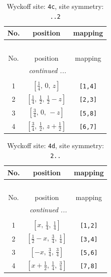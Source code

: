 \documentclass[fleqn,8pt]{jsarticle}
\begin{document}
\renewcommand{\arraystretch}{1.2}
\begin{longtable}{ccc}
\caption{Wyckoff site: {\tt 4c}, site symmetry: {\tt ..2}}
 \\
 \hline \hline
No. & position & mapping \\ \hline \endfirsthead

\multicolumn{2}{l}{\tablename\ \thetable{}} \\
 \hline \hline
No. & position & mapping \\ \hline \endhead

 \hline \hline
\multicolumn{2}{r}{\footnotesize\it continued ...} \\ \endfoot

 \hline \hline
\multicolumn{2}{r}{} \\ \endlastfoot

1 & $\left[ \frac{1}{4},\, 0,\, z \right]$ & {\tt [1,4]} \\ \hline
2 & $\left[ \frac{1}{4},\, \frac{1}{2},\, \frac{1}{2} - z \right]$ & {\tt [2,3]} \\ \hline
3 & $\left[ \frac{3}{4},\, 0,\, - z \right]$ & {\tt [5,8]} \\ \hline
4 & $\left[ \frac{3}{4},\, \frac{1}{2},\, z + \frac{1}{2} \right]$ & {\tt [6,7]} \\
\end{longtable}
\renewcommand{\arraystretch}{1.2}
\begin{longtable}{ccc}
\caption{Wyckoff site: {\tt 4d}, site symmetry: {\tt 2..}}
 \\
 \hline \hline
No. & position & mapping \\ \hline \endfirsthead

\multicolumn{2}{l}{\tablename\ \thetable{}} \\
 \hline \hline
No. & position & mapping \\ \hline \endhead

 \hline \hline
\multicolumn{2}{r}{\footnotesize\it continued ...} \\ \endfoot

 \hline \hline
\multicolumn{2}{r}{} \\ \endlastfoot

1 & $\left[ x,\, \frac{1}{4},\, \frac{1}{4} \right]$ & {\tt [1,2]} \\ \hline
2 & $\left[ \frac{1}{2} - x,\, \frac{3}{4},\, \frac{1}{4} \right]$ & {\tt [3,4]} \\ \hline
3 & $\left[ - x,\, \frac{3}{4},\, \frac{3}{4} \right]$ & {\tt [5,6]} \\ \hline
4 & $\left[ x + \frac{1}{2},\, \frac{1}{4},\, \frac{3}{4} \right]$ & {\tt [7,8]} \\
\end{longtable}
\end{document}
